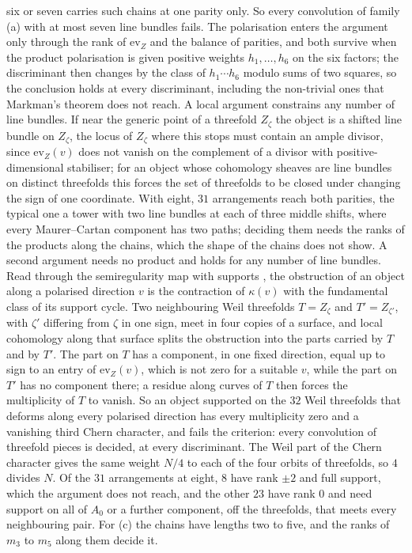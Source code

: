 six or seven carries such chains at one parity only. So every convolution of family (a) with at most seven line bundles fails. The polarisation enters the argument only through the rank of $\mathrm{ev}_{Z}$ and the balance of parities, and both survive when the product polarisation is given positive weights $h_{1},\dots,h_{6}$ on the six factors; the discriminant then changes by the class of $h_{1}\cdots h_{6}$ modulo sums of two squares, so the conclusion holds at every discriminant, including the non-trivial ones that Markman's theorem does not reach. A local argument constrains any number of line bundles. If near the generic point of a threefold $Z_{\zeta}$ the object is a shifted line bundle on $Z_{\zeta}$, the locus of $Z_{\zeta}$ where this stops must contain an ample divisor, since $\mathrm{ev}_{Z}(v)$ does not vanish on the complement of a divisor with positive-dimensional stabiliser; for an object whose cohomology sheaves are line bundles on distinct threefolds this forces the set of threefolds to be closed under changing the sign of one coordinate. With eight, $31$ arrangements reach both parities, the typical one a tower with two line bundles at each of three middle shifts, where every Maurer--Cartan component has two paths; deciding them needs the ranks of the products along the chains, which the shape of the chains does not show. A second argument needs no product and holds for any number of line bundles. Read through the semiregularity map with supports \cite{BF03}, the obstruction of an object along a polarised direction $v$ is the contraction of $\kappa(v)$ with the fundamental class of its support cycle. Two neighbouring Weil threefolds $T=Z_{\zeta}$ and $T'=Z_{\zeta'}$, with $\zeta'$ differing from $\zeta$ in one sign, meet in four copies of a surface, and local cohomology along that surface splits the obstruction into the parts carried by $T$ and by $T'$. The part on $T$ has a component, in one fixed direction, equal up to sign to an entry of $\mathrm{ev}_{Z}(v)$, which is not zero for a suitable $v$, while the part on $T'$ has no component there; a residue along curves of $T$ then forces the multiplicity of $T$ to vanish. So an object supported on the $32$ Weil threefolds that deforms along every polarised direction has every multiplicity zero and a vanishing third Chern character, and fails the criterion: every convolution of threefold pieces is decided, at every discriminant. The Weil part of the Chern character gives the same weight $N/4$ to each of the four orbits of threefolds, so $4$ divides $N$. Of the $31$ arrangements at eight, $8$ have rank $\pm2$ and full support, which the argument does not reach, and the other $23$ have rank $0$ and need support on all of $A_{0}$ or a further component, off the threefolds, that meets every neighbouring pair. For (c) the chains have lengths two to five, and the ranks of $m_{3}$ to $m_{5}$ along them decide it.

